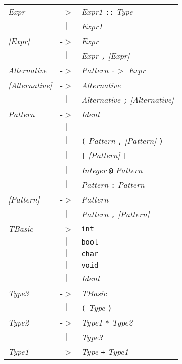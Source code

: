 \documentclass{article}
\begin{document}
\begin{center}
\begin{tabular}{lll}
\textit{Expr} & -$>$ & \textit{Expr1} \texttt{::} \textit{Type} \\
 & \multicolumn{1}{c}{\textbf{$|$}} & \textit{Expr1} \\
\textit{[Expr]} & -$>$ & \textit{Expr} \\
 & \multicolumn{1}{c}{\textbf{$|$}} & \textit{Expr} \texttt{,} \textit{[Expr]} \\
\textit{Alternative} & -$>$ & \textit{Pattern} \texttt{-$>$} \textit{Expr} \\
\textit{[Alternative]} & -$>$ & \textit{Alternative} \\
 & \multicolumn{1}{c}{\textbf{$|$}} & \textit{Alternative} \texttt{;} \textit{[Alternative]} \\
\textit{Pattern} & -$>$ & \textit{Ident} \\
 & \multicolumn{1}{c}{\textbf{$|$}} & \texttt{\_} \\
 & \multicolumn{1}{c}{\textbf{$|$}} & \texttt{(} \textit{Pattern} \texttt{,} \textit{[Pattern]} \texttt{)} \\
 & \multicolumn{1}{c}{\textbf{$|$}} & \texttt{[} \textit{[Pattern]} \texttt{]} \\
 & \multicolumn{1}{c}{\textbf{$|$}} & \textit{Integer} \texttt{@} \textit{Pattern} \\
 & \multicolumn{1}{c}{\textbf{$|$}} & \textit{Pattern} \texttt{:} \textit{Pattern} \\
\textit{[Pattern]} & -$>$ & \textit{Pattern} \\
 & \multicolumn{1}{c}{\textbf{$|$}} & \textit{Pattern} \texttt{,} \textit{[Pattern]} \\
\textit{TBasic} & -$>$ & \texttt{int} \\
 & \multicolumn{1}{c}{\textbf{$|$}} & \texttt{bool} \\
 & \multicolumn{1}{c}{\textbf{$|$}} & \texttt{char} \\
 & \multicolumn{1}{c}{\textbf{$|$}} & \texttt{void} \\
 & \multicolumn{1}{c}{\textbf{$|$}} & \textit{Ident} \\
\textit{Type3} & -$>$ & \textit{TBasic} \\
 & \multicolumn{1}{c}{\textbf{$|$}} & \texttt{(} \textit{Type} \texttt{)} \\
\textit{Type2} & -$>$ & \textit{Type1} \texttt{*} \textit{Type2} \\
 & \multicolumn{1}{c}{\textbf{$|$}} & \textit{Type3} \\
\textit{Type1} & -$>$ & \textit{Type} \texttt{+} \textit{Type1} \\

\end{tabular}
\end{center}
\end{document}
